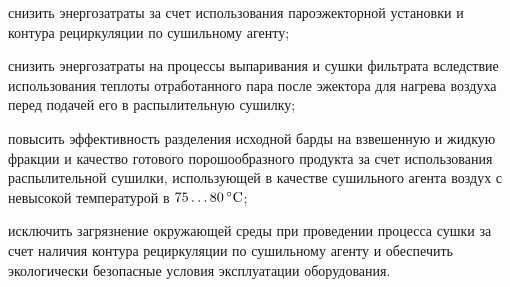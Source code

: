 снизить энергозатраты за счет использования пароэжекторной установки и контура рециркуляции по сушильному агенту;

снизить энергозатраты на процессы выпаривания и сушки фильтрата вследствие использования теплоты отработанного пара после эжектора для нагрева воздуха перед подачей его в распылительную сушилку;

повысить эффективность разделения исходной барды на взвешенную и жидкую фракции и качество готового порошообразного продукта за счет использования распылительной сушилки, использующей в качестве сушильного агента воздух с невысокой температурой в $75\dots80\,^{\circ}\mathrm{C}$;

исключить загрязнение окружающей среды при проведении процесса сушки за счет наличия контура рециркуляции по сушильному агенту и обеспечить экологически безопасные условия эксплуатации оборудования.


